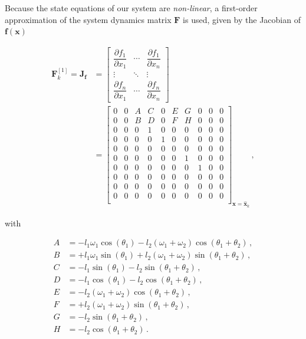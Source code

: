 Because the state equations of our system are \emph{non-linear}, a first-order approximation of the system dynamics matrix $\mathbf{F}$ is used, given by the Jacobian of $\mathbf{f}(\mathbf{x})$

\begin{equation}
\begin{split}
\mathbf{F}^{[1]}_k = \mathbf{J}_{\mathbf{f}} &= \begin{bmatrix}
    \dfrac{\partial f_1}{\partial x_1} & \cdots & \dfrac{\partial f_1}{\partial x_{n}}\\
    \vdots & \ddots & \vdots\\
    \dfrac{\partial f_{n}}{\partial x_1} & \cdots & \dfrac{\partial f_{n}}{\partial x_{n}} \end{bmatrix} \\
&=\begin{bmatrix}
  0 & 0 & A & C & 0 & E & G & 0 & 0 & 0\\
  0 & 0 & B & D & 0 & F & H & 0 & 0 & 0\\
  0 & 0 & 0 & 1 & 0 & 0 & 0 & 0 & 0 & 0\\
  0 & 0 & 0 & 0 & 1 & 0 & 0 & 0 & 0 & 0\\
  0 & 0 & 0 & 0 & 0 & 0 & 0 & 0 & 0 & 0\\
  0 & 0 & 0 & 0 & 0 & 0 & 1 & 0 & 0 & 0\\
  0 & 0 & 0 & 0 & 0 & 0 & 0 & 1 & 0 & 0\\
  0 & 0 & 0 & 0 & 0 & 0 & 0 & 0 & 0 & 0\\
  0 & 0 & 0 & 0 & 0 & 0 & 0 & 0 & 0 & 0\\
  0 & 0 & 0 & 0 & 0 & 0 & 0 & 0 & 0 & 0\\
\end{bmatrix}_{\mathbf{x}=\hat{\mathbf{x}}_{k}}\,,
\end{split}
\end{equation}

\noindent
with

\begin{equation*}
  \begin{split}
  	A &= -l_1 \omega_1 \cos(\theta_1) -l_2 (\omega_1 + \omega_2) \cos(\theta_1 + \theta_2)\,, \\
  	B &= +l_1 \omega_1 \sin(\theta_1) +l_2 (\omega_1 + \omega_2) \sin(\theta_1 + \theta_2)\,, \\
  	C &= -l_1 \sin(\theta_1) -l_2 \sin (\theta_1 + \theta_2)\,, \\
  	D &= -l_1 \cos(\theta_1) - l_2 \cos (\theta_1 + \theta_2)\,, \\
  	E &= -l_2 (\omega_1 + \omega_2) \cos(\theta_1+ \theta_2)\,, \\
  	F &= +l_2 (\omega_1 + \omega_2) \sin(\theta_1+ \theta_2)\,, \\
    G &= -l_2 \sin (\theta_1 + \theta_2)\,, \\
    H &= -l_2 \cos (\theta_1 + \theta_2)\,.
  \end{split}
\end{equation*}

